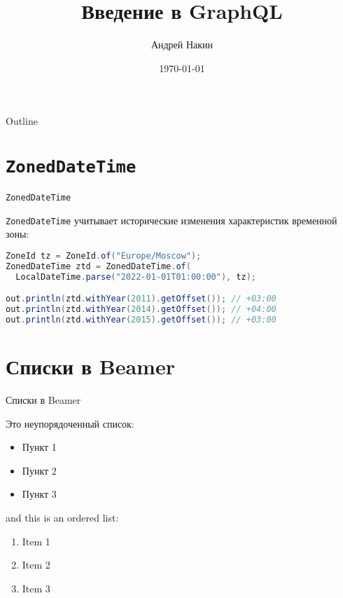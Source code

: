 \documentclass{beamer}
\title{Введение в GraphQL}
\author{Андрей Накин}
\date{\today}
\begin{document}
\begin{frame}
    \titlepage 
\end{frame}



\begin{frame}{Outline}
    \tableofcontents
\end{frame}


\section{{\tt ZonedDateTime}}

\begin{frame}[fragile]{{\tt ZonedDateTime}}

{\tt ZonedDateTime} учитывает исторические изменения характеристик временной зоны:
\bigskip

\begin{lstlisting}[language=java]
ZoneId tz = ZoneId.of("Europe/Moscow");
ZonedDateTime ztd = ZonedDateTime.of(
  LocalDateTime.parse("2022-01-01T01:00:00"), tz);

out.println(ztd.withYear(2011).getOffset()); // +03:00
out.println(ztd.withYear(2014).getOffset()); // +04:00
out.println(ztd.withYear(2015).getOffset()); // +03:00
\end{lstlisting}

\end{frame}

\section{Списки в Beamer}
\begin{frame}{Списки в Beamer}

Это неупорядоченный список:
\begin{itemize}
    \item Пункт 1
    \item Пункт 2
    \item Пункт 3
\end{itemize}

and this is an ordered list:
\begin{enumerate}
    \item Item 1
    \item Item 2
    \item Item 3
\end{enumerate}

\end{frame}
\end{document}
